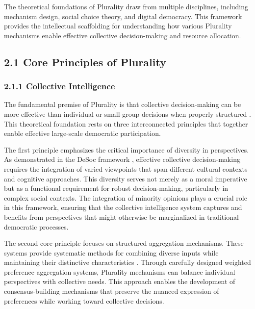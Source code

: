 The theoretical foundations of Plurality draw from multiple disciplines, including mechanism design, social choice theory, and digital democracy. This framework provides the intellectual scaffolding for understanding how various Plurality mechanisms enable effective collective decision-making and resource allocation.

\hypertarget{core-principles-of-plurality}{%
\subsection{2.1 Core Principles of Plurality}\label{core-principles-of-plurality}}

\hypertarget{collective-intelligence}{%
\subsubsection{2.1.1 Collective Intelligence}\label{collective-intelligence}}

The fundamental premise of Plurality is that collective decision-making can be more effective than individual or small-group decisions when properly structured \citep{weyl2022decentralized}. This theoretical foundation rests on three interconnected principles that together enable effective large-scale democratic participation.

The first principle emphasizes the critical importance of diversity in perspectives. As demonstrated in the DeSoc framework \citep{weyl2022decentralized}, effective collective decision-making requires the integration of varied viewpoints that span different cultural contexts and cognitive approaches. This diversity serves not merely as a moral imperative but as a functional requirement for robust decision-making, particularly in complex social contexts. The integration of minority opinions plays a crucial role in this framework, ensuring that the collective intelligence system captures and benefits from perspectives that might otherwise be marginalized in traditional democratic processes.

The second core principle focuses on structured aggregation mechanisms. These systems provide systematic methods for combining diverse inputs while maintaining their distinctive characteristics \citep{buterin2019flexible}. Through carefully designed weighted preference aggregation systems, Plurality mechanisms can balance individual perspectives with collective needs. This approach enables the development of consensus-building mechanisms that preserve the nuanced expression of preferences while working toward collective decisions.

